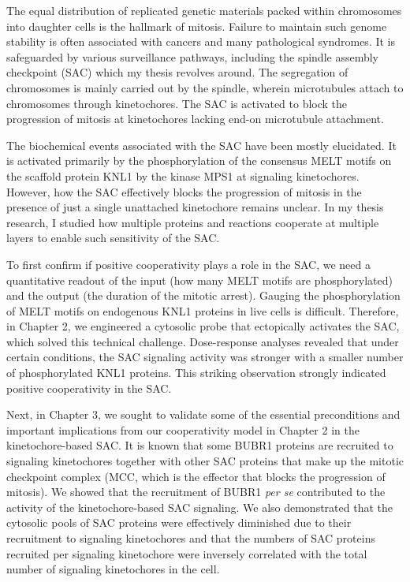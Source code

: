The equal distribution of replicated genetic materials packed within chromosomes into daughter cells is the hallmark of mitosis. Failure to maintain such genome stability is often associated with cancers and many pathological syndromes. It is safeguarded by various surveillance pathways, including the spindle assembly checkpoint (SAC) which my thesis revolves around. The segregation of chromosomes is mainly carried out by the spindle, wherein microtubules attach to chromosomes through kinetochores. The SAC is activated to block the progression of mitosis at kinetochores lacking end-on microtubule attachment.

The biochemical events associated with the SAC have been mostly elucidated. It is activated primarily by the phosphorylation of the consensus MELT motifs on the scaffold protein KNL1 by the kinase MPS1 at signaling kinetochores. However, how the SAC effectively blocks the progression of mitosis in the presence of just a single unattached kinetochore remains unclear. In my thesis research, I studied how multiple proteins and reactions cooperate at multiple layers to enable such sensitivity of the SAC.

To first confirm if positive cooperativity plays a role in the SAC, we need a quantitative readout of the input (how many MELT motifs are phosphorylated) and the output (the duration of the mitotic arrest). Gauging the phosphorylation of MELT motifs on endogenous KNL1 proteins in live cells is difficult. Therefore, in Chapter 2, we engineered a cytosolic probe that ectopically activates the SAC, which solved this technical challenge. Dose-response analyses revealed that under certain conditions, the SAC signaling activity was stronger with a smaller number of phosphorylated KNL1 proteins. This striking observation strongly indicated positive cooperativity in the SAC.

Next, in Chapter 3, we sought to validate some of the essential preconditions and important implications from our cooperativity model in Chapter 2 in the kinetochore-based SAC. It is known that some BUBR1 proteins are recruited to signaling kinetochores together with other SAC proteins that make up the mitotic checkpoint complex (MCC, which is the effector that blocks the progression of mitosis). We showed that the recruitment of BUBR1 \textit{per se} contributed to the activity of the kinetochore-based SAC signaling. We also demonstrated that the cytosolic pools of SAC proteins were effectively diminished due to their recruitment to signaling kinetochores and that the numbers of SAC proteins recruited per signaling kinetochore were inversely correlated with the total number of signaling kinetochores in the cell.

